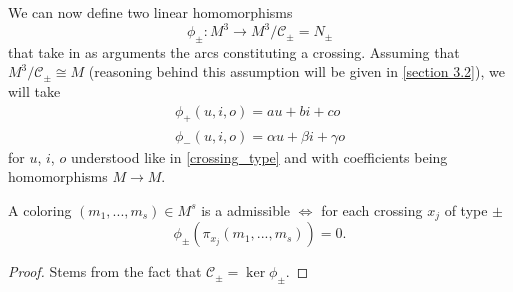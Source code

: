 We can now define two linear homomorphisms
$$\phi_\pm:M^3\to M^3/\mathcal{C}_\pm=N_\pm$$
that take in as arguments the arcs constituting a crossing. Assuming that $M^3/\mathcal{C}_\pm\cong M$ (reasoning behind this assumption will be given in \cref{section 3.2}), we will take 
\begin{align}
  \phi_+(u,i,o)=au+bi+co \label{phi equations1} \\ 
  \phi_-(u,i,o)=\alpha u+\beta i+\gamma o \label{phi equations2}
\end{align}
for $u$, $i$, $o$ understood like in \cref{crossing_type} and with coefficients being homomorphisms $M\to M$.

\begin{lemma}\label{proposition male kernel kolorowania}
  A coloring $(m_1,..., m_s)\in M^s$ is a admissible $\iff$ for each crossing $x_j$ of type $\pm$ 
  $$\phi_\pm(\pi_{x_j}(m_1,...,m_s))=0.$$
\end{lemma}

\begin{proof}
  Stems from the fact that $\mathcal{C}_\pm=\ker\phi_\pm$.
\end{proof}

